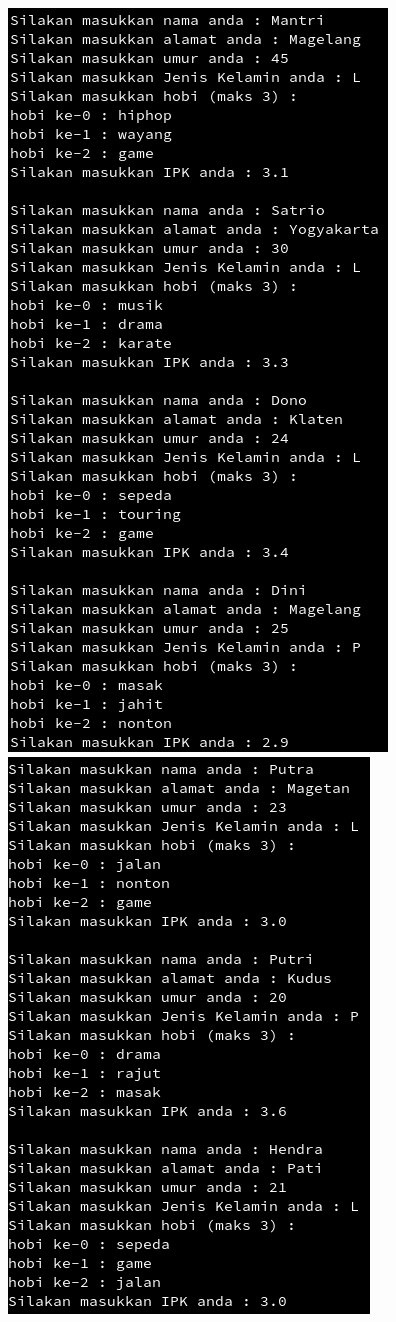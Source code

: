 \documentclass[a4paper,12pt]{article}
\begin{document}
\begin{center}
    \includegraphics[scale=.7]{lat3.png} 
    \includegraphics[scale=.7]{lat4.png} 

\end{center}
\end{document}
